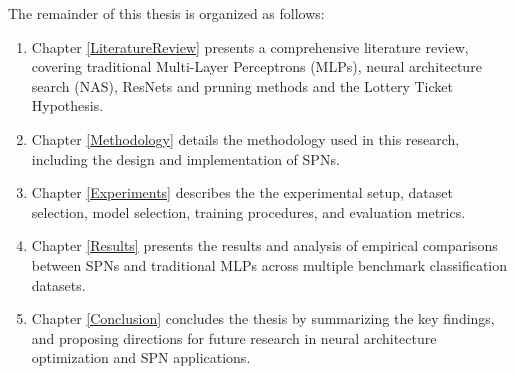 The remainder of this thesis is organized as follows:
\begin{enumerate}
    \item Chapter \ref{LiteratureReview} presents a comprehensive literature review, covering traditional Multi-Layer Perceptrons (MLPs), neural architecture search (NAS), ResNets and pruning methods and the Lottery Ticket Hypothesis.
    \item Chapter \ref{Methodology} details the methodology used in this research, including the design and implementation of SPNs.
    \item Chapter \ref{Experiments} describes the the experimental setup, dataset selection, model selection, training procedures, and evaluation metrics.
    \item Chapter \ref{Results} presents the results and analysis of empirical comparisons between SPNs and traditional MLPs across multiple benchmark classification datasets.
    \item Chapter \ref{Conclusion} concludes the thesis by summarizing the key findings, and proposing directions for future research in neural architecture optimization and SPN applications.
\end{enumerate}